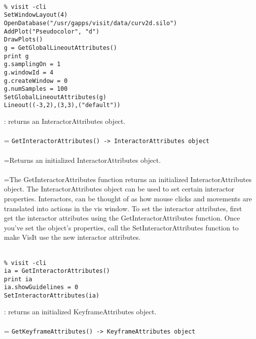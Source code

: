 \documentclass[10pt,a4paper]{report}
\begin{document}
\\[-6mm]
\begin{verbatim}% visit -cli
SetWindowLayout(4)
OpenDatabase("/usr/gapps/visit/data/curv2d.silo")
AddPlot("Pseudocolor", "d")
DrawPlots()
g = GetGlobalLineoutAttributes()
print g
g.samplingOn = 1
g.windowId = 4
g.createWindow = 0
g.numSamples = 100
SetGlobalLineoutAttributes(g)
Lineout((-3,2),(3,3),("default"))
\end{verbatim}
\newpage


{}
: returns an InteractorAttributes object.\\[-3mm]

 \\ 
\hangindent=\parindent 
\verb!GetInteractorAttributes() -> InteractorAttributes object!\\ [-3mm]

 \\ 
\hangindent=\parindent Returns an initialized InteractorAttributes object. \\[-3mm] 

 \\ 
\hangindent=\parindent The GetInteractorAttributes function returns an initialized InteractorAttributes object. The InteractorAttributes object can be used to set certain interactor properties. Interactors, can be thought of as how mouse clicks and movements are translated into actions in the vis window. To set the interactor attributes, first get the interactor attributes using the GetInteractorAttributes function. Once you've set the object's properties, call the SetInteractorAttributes function to make VisIt use the new interactor attributes. \\[-3mm] 

\\[-6mm]
\begin{verbatim}% visit -cli
ia = GetInteractorAttributes()
print ia
ia.showGuidelines = 0
SetInteractorAttributes(ia)
\end{verbatim}
\newpage


{}
: returns an initialized KeyframeAttributes object.\\[-3mm]

 \\ 
\hangindent=\parindent 
\verb!GetKeyframeAttributes() -> KeyframeAttributes object!\\ [-3mm]
\end{document}
